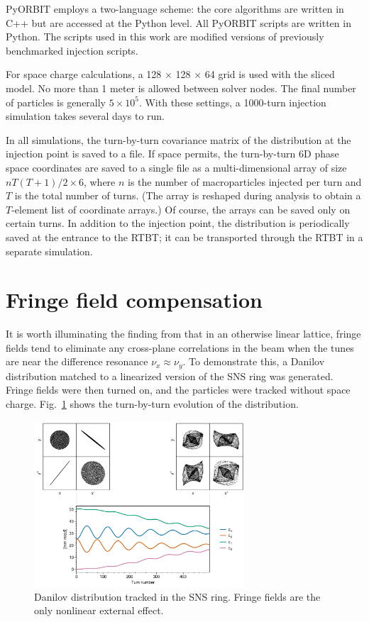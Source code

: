 PyORBIT employs a two-language scheme: the core algorithms are written in C++ but are accessed at the Python level. All PyORBIT scripts are written in Python. The scripts used in this work are modified versions of previously benchmarked injection scripts.

For space charge calculations, a 128 $\times$ 128 $\times$ 64 grid is used with the sliced model. No more than 1 meter is allowed between solver nodes. The final number of particles is generally $5 \times 10^{5}$. With these settings, a 1000-turn injection simulation takes several days to run.

In all simulations, the turn-by-turn covariance matrix of the distribution at the injection point is saved to a file. If space permits, the turn-by-turn 6D phase space coordinates are saved to a single file as a multi-dimensional array of size $n T (T + 1) / 2 \times 6$, where $n$ is the number of macroparticles injected per turn and $T$ is the total number of turns. (The array is reshaped during analysis to obtain a $T$-element list of coordinate arrays.) Of course, the arrays can be saved only on certain turns. In addition to the injection point, the distribution is periodically saved at the entrance to the RTBT; it can be transported through the RTBT in a separate simulation.




\section{Fringe field compensation}

It is worth illuminating the finding from \cite{Holmes2018} that in an otherwise linear lattice, fringe fields tend to eliminate any cross-plane correlations in the beam when the tunes are near the difference resonance $\nu_x \approx \nu_y$. To demonstrate this, a Danilov distribution matched to a linearized version of the SNS ring was generated. Fringe fields were then turned on, and the particles were tracked without space charge. Fig.~\ref{fig:fringe_a} shows the turn-by-turn evolution of the distribution.

\begin{figure}[!p]
    \centering
    \includegraphics[width=0.7\textwidth]{Images/chapter3/fringe.png}
    \caption{Danilov distribution tracked in the SNS ring. Fringe fields are the only nonlinear external effect.}
    \label{fig:fringe_a}
    \vspace*{3cm}
\end{figure}


